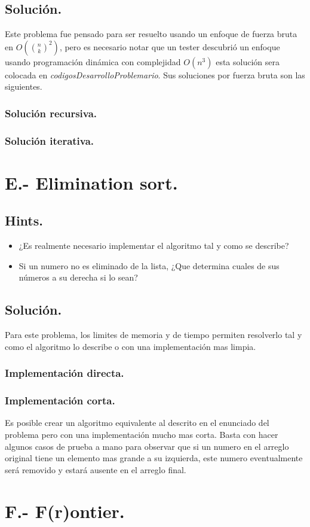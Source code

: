 \documentclass[12pt,letterpaper,titlepage]{article}
\begin{document}
	\subsection{Solución.}
	Este problema fue pensado para ser resuelto usando un enfoque de fuerza bruta en $O(\binom{n}{k}^{2})$, pero es necesario notar que un tester descubrió un enfoque usando programación dinámica con complejidad $O(n^{3})$ esta solución sera colocada en \textit{codigosDesarrolloProblemario}. Sus soluciones por fuerza bruta son las siguientes.
	\subsubsection{Solución recursiva.} 
	
	\subsubsection{Solución iterativa.} 
	
\clearpage\section{E.- Elimination sort.}
\subsection{Hints.}
	\begin{itemize}
		\item ¿Es realmente necesario implementar el algoritmo tal y como se describe?
		\item Si un numero no es eliminado de la lista, ¿Que determina cuales de sus números a su derecha si lo sean?
	\end{itemize}
\subsection{Solución.}
	Para este problema, los limites de memoria y de tiempo permiten resolverlo tal y como el algoritmo lo describe o con una implementación mas limpia.
\subsubsection{Implementación directa.}

\subsubsection{Implementación corta.}
Es posible crear un algoritmo equivalente al descrito en el enunciado del problema pero con una implementación mucho mas corta. Basta con hacer algunos casos de prueba a mano para observar que si un numero en el arreglo original tiene un elemento mas grande a su izquierda, este numero eventualmente será removido y estará ausente en el arreglo final.

\clearpage\section{F.- F(r)ontier.}
\end{document}
